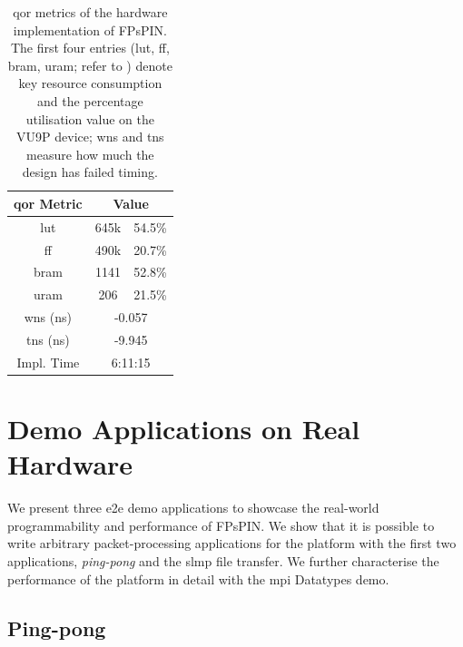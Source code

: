 \begin{table}[tp]
    \centering
    \begin{tabular}{ccc}
    \toprule
    \ac{qor} Metric & \multicolumn{2}{c}{Value} \\ \midrule
    \ac{lut} & 645k & 54.5\% \\
    \ac{ff} & 490k & 20.7\% \\
    \ac{bram} & 1141 & 52.8\% \\
    \ac{uram} & 206 & 21.5\% \\
    \ac{wns} (ns) & \multicolumn{2}{c}{-0.057} \\
    \ac{tns} (ns) & \multicolumn{2}{c}{-9.945} \\
    Impl. Time & \multicolumn{2}{c}{6:11:15} \\
    \bottomrule
    \end{tabular}
    \caption{\ac{qor} metrics of the hardware implementation of FPsPIN.  The first four entries (\ac{lut}, \ac{ff}, \ac{bram}, \ac{uram}; refer to ) denote key resource consumption and the percentage utilisation value on the VU9P device; \ac{wns} and \ac{tns} measure how much the design has failed timing.} \label{tab:design-qor}
\end{table}

\section{Demo Applications on Real Hardware} \label{sec:demos}

We present three \ac{e2e} demo applications to showcase the real-world programmability and performance of FPsPIN.  We show that it is possible to write arbitrary packet-processing applications for the platform with the first two applications, \emph{ping-pong} and the \ac{slmp} file transfer.  We further characterise the performance of the platform in detail with the \ac{mpi} Datatypes demo.


\subsection{Ping-pong} \label{sec:demos-ping-pong}

